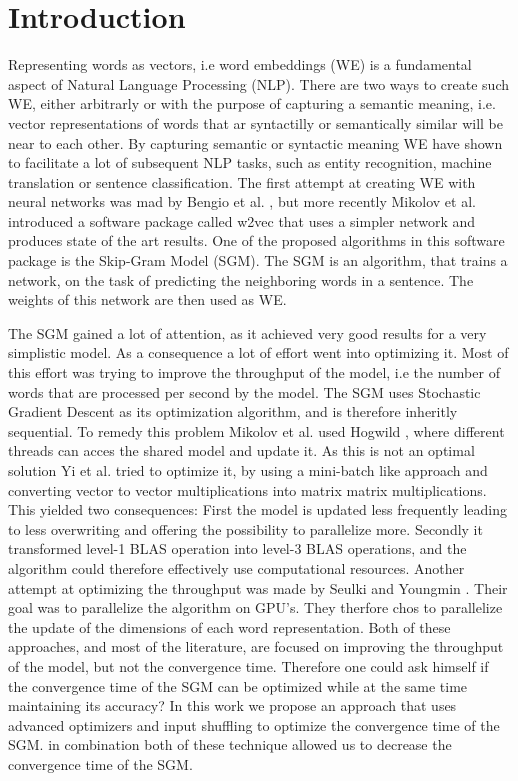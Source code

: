 \chapter{Introduction}\label{chap:introduction}

Representing words as vectors, i.e word embeddings (WE) is a fundamental aspect of Natural Language Processing (NLP). There are two ways to create such WE, either arbitrarly or with the purpose of capturing a semantic meaning, i.e. vector representations of words that ar syntactilly or semantically similar will be near to each other. By capturing semantic or syntactic meaning WE have shown to facilitate a lot of subsequent NLP tasks, such as entity recognition, machine translation or sentence classification.  The first attempt at creating WE with neural networks was mad by Bengio et al. \cite{bengio}, but more recently Mikolov et al. \cite{mikolov} introduced a software package called w2vec that uses a simpler network and produces state of the art results. One of the proposed algorithms in this software package is the Skip-Gram Model (SGM). The SGM is an algorithm, that trains a network, on the task of predicting the neighboring words in a sentence. The weights of this network are then used as WE. 

The SGM gained a lot of attention, as it achieved very good results for a very simplistic model. As a consequence a lot of effort went into optimizing  it. Most of this effort was trying to improve the throughput of the model, i.e the number of words that are processed per second by the model. The SGM uses Stochastic Gradient Descent as its optimization algorithm, and is therefore inheritly sequential. To remedy this problem Mikolov et al. used Hogwild \cite{hogwild}, where different threads can acces the shared model and update it. As this is not an optimal solution Yi et al. \cite{intel} tried to optimize it, by using a mini-batch like approach and converting vector to vector multiplications into matrix matrix multiplications. This yielded two consequences: First the model is updated less frequently leading to less overwriting and offering the possibility to parallelize more. Secondly it transformed level-1 BLAS operation into level-3 BLAS operations, and the algorithm could therefore effectively use computational resources. Another attempt at optimizing the throughput was made by Seulki and Youngmin \cite{gpu}. Their goal was to parallelize the algorithm on GPU's. They therfore chos to parallelize the update of the dimensions of each word representation. Both of these approaches, and most of the literature, are focused on improving the throughput of the model, but not the convergence time.  Therefore one could ask himself if the convergence time of the SGM can be optimized while at the same time maintaining its accuracy? In this work we propose an approach that uses advanced optimizers and input shuffling to optimize the convergence time of the SGM. in combination both of these technique allowed us to decrease the convergence time of the SGM.\\

